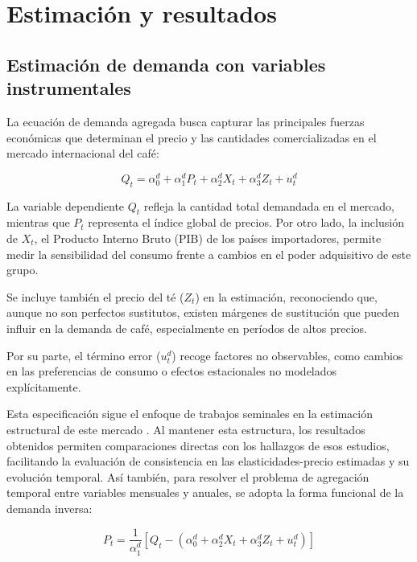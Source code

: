 \chapter{Estimación y resultados}
\label{chap:estimaciones}
\section{Estimación de demanda con variables instrumentales}

La ecuación de demanda agregada busca capturar las principales fuerzas económicas que determinan el precio y las cantidades comercializadas en el mercado internacional del café:

\begin{equation}
    Q_{t} = \alpha^{d}_{0} + \alpha^{d}_{1}P_{t} + \alpha^{d}_{2}X_{t} + \alpha^{d}_{3}Z_{t} + u^{d}_{t}
\end{equation}

La variable dependiente $Q_{t}$ refleja la cantidad total demandada en el mercado, mientras que $P_{t}$ representa el índice global de precios. Por otro lado, la inclusión de $X_{t}$, el Producto Interno Bruto (PIB) de los países importadores, permite medir la sensibilidad del consumo frente a cambios en el poder adquisitivo de este grupo.

Se incluye también el precio del té ($Z_{t}$) en la estimación, reconociendo que, aunque no son perfectos sustitutos, existen márgenes de sustitución que pueden influir en la demanda de café, especialmente en períodos de altos precios.

Por su parte, el término error ($u^{d}_{t}$) recoge factores no observables, como cambios en las preferencias de consumo o efectos estacionales no modelados explícitamente.

Esta especificación sigue el enfoque de trabajos seminales en la estimación estructural de este mercado \citep{karp1993dynamic, igami2015market}. Al mantener esta estructura, los resultados obtenidos permiten comparaciones directas con los hallazgos de esos estudios, facilitando la evaluación de consistencia en las elasticidades-precio estimadas y su evolución temporal. Así también, para resolver el problema de agregación temporal entre variables mensuales y anuales, se adopta la forma funcional de la demanda inversa:

\begin{equation}
    P_{t} = \frac{1}{\alpha^{d}_{1}} \left[ Q_{t} - ( \alpha^{d}_{0} + \alpha^{d}_{2}X_{t} + \alpha^{d}_{3}Z_{t} + u^{d}_{t} ) \right]
\end{equation}

